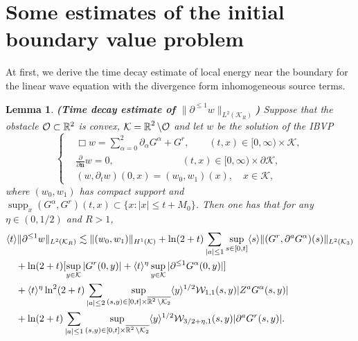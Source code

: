 \documentclass[11pt,twoside]{article}
\def\cK{\mathcal K}
\def\cO{\mathcal O}
\def\cW{\mathcal W}
\def\R{\mathop{\mathbb R\kern 0pt}\nolimits}
\def\supp{\mathop{\rm supp}\nolimits}
\def\p{\partial}
\def\supp{\operatorname{supp}}
\def\ls{\lesssim}
\def\bn{\mathbf{n}}
\newcommand{\w}[1]{\langle {#1} \rangle}
\theoremstyle{plain}
\newtheorem{lemma}[theorem]{Lemma}
\theoremstyle{definition}
\numberwithin{equation}{section}
\begin{document}
\section{Some estimates of the initial boundary value problem}\label{sect3}

At first, we derive the time decay estimate of local energy  near the boundary for the linear wave equation
with the divergence form inhomogeneous source terms.
\begin{lemma}
{\bf (Time decay estimate of $\|\p^{\le1}w\|_{L^2(\cK_R)}$)}
Suppose that the obstacle $\cO\subset\Bbb R^2$ is convex, $\cK=\R^2\setminus\cO$ and let $w$ be the solution of the IBVP
\begin{equation*}
\left\{
\begin{aligned}
&\Box w=\sum_{\alpha=0}^2\p_{\alpha}G^\alpha+G^r,\qquad(t,x)\in[0,\infty)\times\cK,\\
&\frac{\p}{\p\bn}w=0,\qquad \quad \qquad\qquad (t,x)\in[0,\infty)\times\p\cK,\\
&(w,\p_tw)(0,x)=(w_0,w_1)(x),\quad x\in\cK,
\end{aligned}
\right.
\end{equation*}
where $(w_0,w_1)$ has compact support and $\supp_x(G^\alpha,G^r)(t,x)\subset\{x: |x|\le t+M_0\}$.
Then one has that for any $\eta\in(0,1/2)$ and $R>1$,
\begin{equation}\label{loc:ibvp}
\begin{split}
&\w{t}\|\p^{\le1}w\|_{L^2(\cK_R)}
\ls\|(w_0,w_1)\|_{H^1(\cK)}+\ln(2+t)\sum_{|a|\le1}\sup_{s\in[0,t]}\w{s}\|(G^r,\p^aG^\alpha)(s)\|_{L^2(\cK_3)}\\
&\quad+\ln(2+t)[\sup_{y\in\cK}|G^r(0,y)|+\w{t}^\eta\sup_{y\in\cK}|\p^{\le1}G^\alpha(0,y)|]\\
&\quad+\w{t}^\eta\ln^2(2+t)\sum_{|a|\le2}\sup_{(s,y)\in[0,t]\times\overline{\R^2\setminus\cK_2}}\w{y}^{1/2}\cW_{1,1}(s,y)|Z^aG^\alpha(s,y)|\\
&\quad+\ln(2+t)\sum_{|a|\le1}\sup_{(s,y)\in[0,t]\times\overline{\R^2\setminus\cK_2}}\w{y}^{1/2}\cW_{3/2+\eta,1}(s,y)|\p^aG^r(s,y)|.
\end{split}
\end{equation}
\end{lemma}
\end{document}
